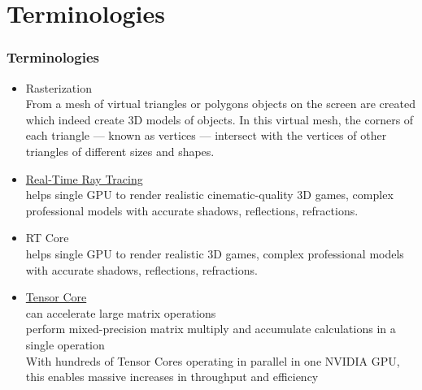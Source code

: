 \documentclass[xcolor=x11names,table]{beamer}
\begin{document}
\section{Terminologies}
	\begin{frame}[allowframebreaks]
	\frametitle{Terminologies}
		\begin{itemize}
			\item Rasterization
			\label{rasterization}
			\\ {\scriptsize 
				From a mesh of virtual triangles or polygons objects on the screen are created which indeed create 3D models of objects. In this virtual mesh, the corners of each triangle — known as vertices — intersect with the vertices of other triangles of different sizes and shapes.
			}
			\item \href{https://developer.nvidia.com/rtx/raytracing}{Real-Time Ray Tracing}
			\label{ray-tracing}
			\\ {\scriptsize 
				helps single GPU to render realistic cinematic-quality 3D games, complex professional models with accurate shadows, reflections, refractions.
			}
			\item RT Core
			\label{rtcore}
			\\ {\scriptsize 
				helps single GPU to render realistic 3D games, complex professional models with accurate shadows, reflections, refractions.
			}
			\item \href{https://www.nvidia.com/en-us/data-center/tensorcore/}{Tensor Core}
			\label{tensorcore}
			\\ {\scriptsize 
				can accelerate large matrix operations
				\\ perform mixed-precision matrix multiply and accumulate calculations in a single operation
				\\ With hundreds of Tensor Cores operating in parallel in one NVIDIA GPU, this enables massive increases in throughput and efficiency
			}
		\end{itemize}
	\end{frame}
\end{document}
